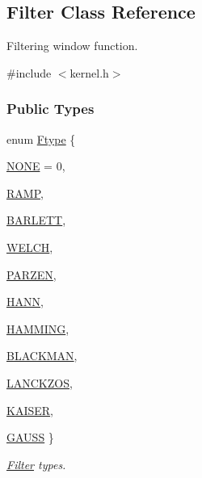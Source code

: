 \hypertarget{classFilter}{
\subsection{Filter Class Reference}
\label{classFilter}
}


Filtering window function.  




{\ttfamily \#include $<$kernel.h$>$}

\subsubsection*{Public Types}
\begin{DoxyCompactItemize}
\item 
enum \hyperlink{classFilter_aa61599baec09f1011f80edc1e9118728}{Ftype} \{ \par
\hyperlink{classFilter_aa61599baec09f1011f80edc1e9118728ae19fe54a915de079e6abc4d9b0e14b94}{NONE} = 0, 
\par
\hyperlink{classFilter_aa61599baec09f1011f80edc1e9118728a4bdd387e7ead67fd82d768908ad67184}{RAMP}, 
\par
\hyperlink{classFilter_aa61599baec09f1011f80edc1e9118728a26a5c04c5f8a3c3f002dc8e6ec7fb4d0}{BARLETT}, 
\par
\hyperlink{classFilter_aa61599baec09f1011f80edc1e9118728afa286e60366f6a9db4fddacffcbe11d7}{WELCH}, 
\par
\hyperlink{classFilter_aa61599baec09f1011f80edc1e9118728a3fad77b240a2e8d821f010d773013ec8}{PARZEN}, 
\par
\hyperlink{classFilter_aa61599baec09f1011f80edc1e9118728a164fdb296a5ec4fc0b570330ebac3a08}{HANN}, 
\par
\hyperlink{classFilter_aa61599baec09f1011f80edc1e9118728a9e2c221e0d6439d1d9c49b8b8e855524}{HAMMING}, 
\par
\hyperlink{classFilter_aa61599baec09f1011f80edc1e9118728a123ceaf7799f23d23a024357f6f8ddba}{BLACKMAN}, 
\par
\hyperlink{classFilter_aa61599baec09f1011f80edc1e9118728a17015a801ac4706d283005952e96b3f3}{LANCKZOS}, 
\par
\hyperlink{classFilter_aa61599baec09f1011f80edc1e9118728a0cffe76968927f1c27666e20a21bbb95}{KAISER}, 
\par
\hyperlink{classFilter_aa61599baec09f1011f80edc1e9118728a5387c69758c56d35e2b4559d6ed634f8}{GAUSS}
 \}
\begin{DoxyCompactList}\small\item\em \hyperlink{classFilter}{Filter} types. \item\end{DoxyCompactList}\end{DoxyCompactItemize}
